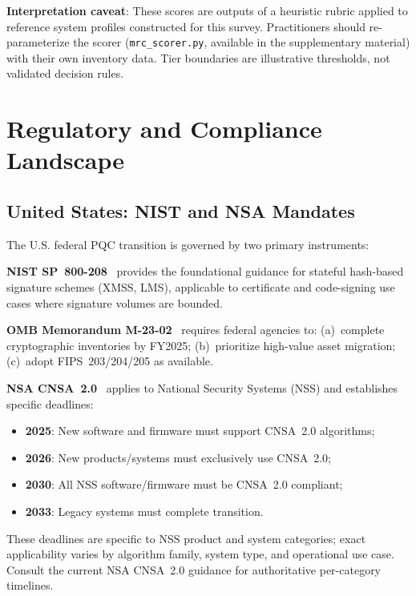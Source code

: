 \documentclass[journal]{IEEEtran}
\begin{document}
\textbf{Interpretation caveat}: These scores are outputs of a heuristic rubric
applied to reference system profiles constructed for this survey. Practitioners
should re-parameterize the scorer (\texttt{mrc\_scorer.py}, available in the
supplementary material) with their own inventory data. Tier boundaries are
illustrative thresholds, not validated decision rules.

\section{Regulatory and Compliance Landscape}
\label{sec:regulatory}

\subsection{United States: NIST and NSA Mandates}

The U.S. federal PQC transition is governed by two primary instruments:

\textbf{NIST SP~800-208}~\cite{cooper2020migration} provides the foundational guidance
for stateful hash-based signature schemes (XMSS, LMS), applicable to
certificate and code-signing use cases where signature volumes are bounded.

\textbf{OMB Memorandum M-23-02}~\cite{omb2023m2302} requires federal agencies
to: (a)~complete cryptographic inventories by FY2025; (b)~prioritize high-value
asset migration; (c)~adopt FIPS~203/204/205 as available.

\textbf{NSA CNSA~2.0}~\cite{nsacnsa2022} applies to National Security Systems
(NSS) and establishes specific deadlines:
\begin{itemize}
  \item \textbf{2025}: New software and firmware must support CNSA~2.0 algorithms;
  \item \textbf{2026}: New products/systems must exclusively use CNSA~2.0;
  \item \textbf{2030}: All NSS software/firmware must be CNSA~2.0 compliant;
  \item \textbf{2033}: Legacy systems must complete transition.
\end{itemize}
These deadlines are specific to NSS product and system categories;
exact applicability varies by algorithm family, system type, and
operational use case. Consult the current NSA CNSA~2.0 guidance for
authoritative per-category timelines.
\end{document}
